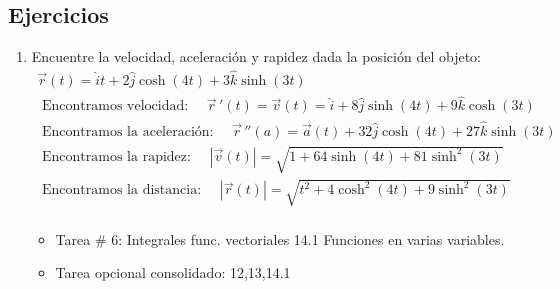 \subsection{Ejercicios}
\begin{enumerate}
    \item Encuentre la velocidad, aceleración y rapidez dada la posición del objeto:
        \begin{align*}
            \vec{r}(t) = \hat{i} t  + 2 \hat{j} \cosh(4t) + 3 \hat{k} \sinh(3t) \\ 
            \text{  Encontramos velocidad:  } \quad \vec{r}\, ' (t) = \vec{v}(t) = \hat{i} + 8 \hat{j} \sinh(4t)+9 \hat{k} \cosh(3t) \\ 
            \text{  Encontramos la aceleración:  } \quad \vec{r}\, ''(a) = \vec{a}(t) + 32 \hat{j} \cosh(4t) + 27 \hat{k} \sinh(3t) \\ 
            \text{  Encontramos la rapidez:   } \quad \left| \vec{v}(t) \right| = \sqrt{1+64\sinh(4t)+81\sinh^2(3t)} \\ 
            \text{  Encontramos la distancia:   } \quad \left| \vec{r}(t) \right| = \sqrt{t^2+4\cosh^2(4t)+9\sinh^2(3t)} \\ 
        \end{align*}
        \begin{itemize}[label=\#]
            \item Tarea \# 6: Integrales func. vectoriales 14.1 Funciones en varias variables.
            \item Tarea opcional consolidado: 12,13,14.1 
        \end{itemize}
    

\end{enumerate}
